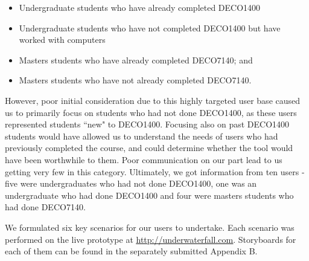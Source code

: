\documentclass[10pt]{article}
\begin{document}
\begin{itemize}
\item Undergraduate students who have already completed DECO1400
\item Undergraduate students who have not completed DECO1400 but have worked with computers
\item Masters students who have already completed DECO7140; and
\item Masters students who have not already completed DECO7140.
\end{itemize}

However, poor initial consideration due to this highly targeted user base caused us to primarily focus on students who had not done DECO1400, as these users represented students ``new" to DECO1400. Focusing also on past DECO1400 students would have allowed us to understand the needs of users who had previously completed the course, and could determine whether the tool would have been worthwhile to them. Poor communication on our part lead to us getting very few in this category. Ultimately, we got information from ten users - five were undergraduates who had not done DECO1400, one was an undergraduate who had done DECO1400 and four were masters students who had done DECO7140.

We formulated six key scenarios for our users to undertake. Each scenario was performed on the live prototype at \underline{\url{http://underwaterfall.com}}. Storyboards for each of them can be found in the separately submitted Appendix B.
\end{document}
